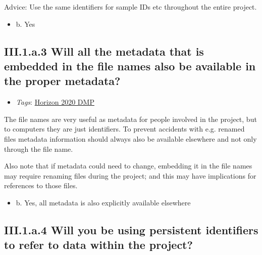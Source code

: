 \documentclass[a4paper,12pt]{report}
\begin{document}
\noindent
\begin{markdown}
Advice: Use the same identifiers for sample IDs etc throughout the entire project.
\end{markdown}



\begin{itemize}
  \item[\CheckmarkBold] b. Yes
\end{itemize}




\subsection*{\protect\textcolor{colorSecId}{III.1.a.3} Will all the metadata that is embedded in the file names also be available in the proper metadata?}

\label{b1df3c74-0b1f-4574-81c4-4cc2d780c1af.8e886b55-3287-48e7-b353-daf6ab40f7d8.c05f27a2-30ac-44fd-9ac9-cd6f62b16d0c.7dfd022e-6d6e-4923-a81a-ca1f11024b57}


\begin{itemize}
  \item \textit{Tags}: \ul{Horizon 2020 DMP}
  \end{itemize}


\noindent
\begin{markdown}
The file names are very useful as metadata for people involved in the project, but to computers they are just identifiers. To prevent accidents with e.g. renamed files metadata information should always also be available elsewhere and not only through the file name.

Also note that if metadata could need to change, embedding it in the file names may require renaming files during the project; and this may have implications for references to those files.
\end{markdown}



\begin{itemize}
  \item[\CheckmarkBold] b. Yes, all metadata is also explicitly available elsewhere
\end{itemize}




\subsection*{\protect\textcolor{colorSecId}{III.1.a.4} Will you be using persistent identifiers to refer to data within the project?}
\end{document}
